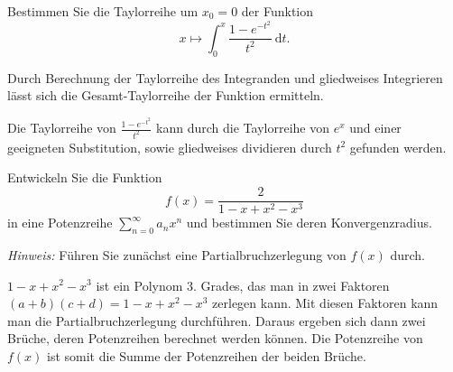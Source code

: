 \documentclass[12pt]{article}
\newenvironment{problem}[2][\textcolor{blue}{Tipps \& Tricks zu}]{\begin{trivlist}
        \item[\hskip \labelsep {\bfseries #1}\hskip \labelsep {\bfseries \textcolor{blue}{#2}.}]}{\end{trivlist}}
\newenvironment{question}[2][\textcolor{red}{Aufgabe}]{\begin{trivlist}
        \item[\hskip \labelsep {\bfseries \textcolor{red}{#1}}\hskip \labelsep {\bfseries \textcolor{red}{#2}.}]}{\end{trivlist}}
\begin{document}
\begin{question}{2}
    Bestimmen Sie die Taylorreihe um $x_0=0$ der Funktion
    \begin{equation}
        x \longmapsto \int_0^x \frac{1-e^{-t^2}}{t^2} \mathrm{~d} t .
    \end{equation}
\end{question}

\begin{problem}{2}
Durch Berechnung der Taylorreihe des Integranden und gliedweises Integrieren lässt sich die Gesamt-Taylorreihe der Funktion ermitteln.

Die Taylorreihe von $\frac{1-e^{-t^2}}{t^2}$ kann durch die Taylorreihe von $e^{x}$ und einer geeigneten Substitution, sowie gliedweises dividieren durch $t^2$ gefunden werden.
\end{problem}

\begin{question}{3}
    Entwickeln Sie die Funktion
    \begin{equation}
        f(x)=\frac{2}{1-x+x^2-x^3}
    \end{equation}
    in eine Potenzreihe $\sum_{n=0}^{\infty} a_n x^n$ und bestimmen Sie deren Konvergenzradius.

    \textit{Hinweis:} Führen Sie zunächst eine Partialbruchzerlegung von $f(x)$ durch.
\end{question}

\begin{problem}{3}
$1-x+x^2-x^3$ ist ein Polynom 3. Grades, das man in zwei Faktoren $(a+b)(c+d)=1-x+x^2-x^3$ zerlegen kann. Mit diesen Faktoren kann man die Partialbruchzerlegung durchführen.  Daraus ergeben sich dann zwei Brüche, deren Potenzreihen berechnet werden können. Die Potenzreihe von $f(x)$ ist somit die Summe der Potenzreihen der beiden Brüche.
\end{problem}
\end{document}
